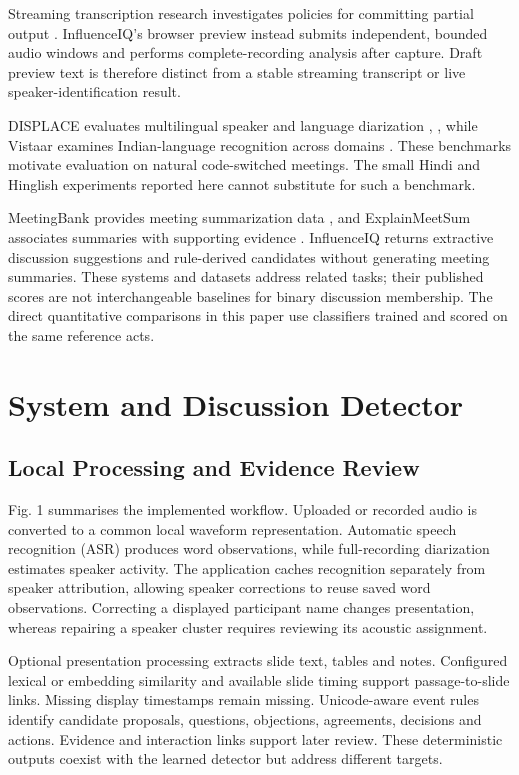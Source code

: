 \documentclass[conference,a4paper]{IEEEtran}
\begin{document}
Streaming transcription research investigates policies for committing partial output \cite{ref6}. InfluenceIQ's browser preview instead submits independent, bounded audio windows and performs complete-recording analysis after capture. Draft preview text is therefore distinct from a stable streaming transcript or live speaker-identification result.

DISPLACE evaluates multilingual speaker and language diarization \cite{ref7}, \cite{ref8}, while Vistaar examines Indian-language recognition across domains \cite{ref9}. These benchmarks motivate evaluation on natural code-switched meetings. The small Hindi and Hinglish experiments reported here cannot substitute for such a benchmark.

MeetingBank provides meeting summarization data \cite{ref10}, and ExplainMeetSum associates summaries with supporting evidence \cite{ref11}. InfluenceIQ returns extractive discussion suggestions and rule-derived candidates without generating meeting summaries. These systems and datasets address related tasks; their published scores are not interchangeable baselines for binary discussion membership. The direct quantitative comparisons in this paper use classifiers trained and scored on the same reference acts.

\section{System and Discussion Detector}
\subsection{Local Processing and Evidence Review}
Fig. 1 summarises the implemented workflow. Uploaded or recorded audio is converted to a common local waveform representation. Automatic speech recognition (ASR) produces word observations, while full-recording diarization estimates speaker activity. The application caches recognition separately from speaker attribution, allowing speaker corrections to reuse saved word observations. Correcting a displayed participant name changes presentation, whereas repairing a speaker cluster requires reviewing its acoustic assignment.

Optional presentation processing extracts slide text, tables and notes. Configured lexical or embedding similarity and available slide timing support passage-to-slide links. Missing display timestamps remain missing. Unicode-aware event rules identify candidate proposals, questions, objections, agreements, decisions and actions. Evidence and interaction links support later review. These deterministic outputs coexist with the learned detector but address different targets.
\end{document}
